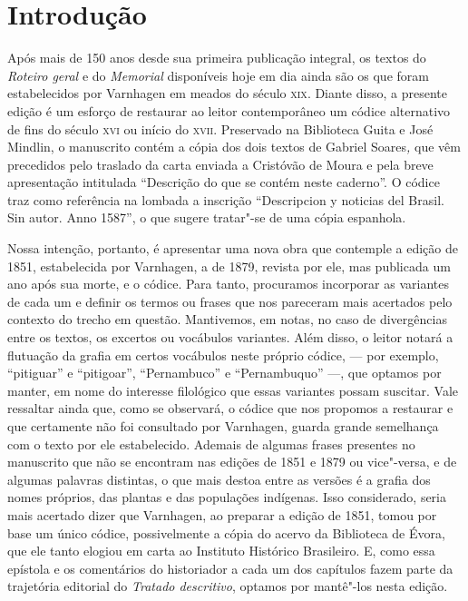 \chapter[Introdução, \emph{por Fernanda Trindade Luciani}]{Introdução}




Após mais de 150 anos desde sua primeira publicação
integral, os textos do \textit{Roteiro geral} e do \textit{Memorial}
disponíveis hoje em dia ainda são os que foram estabelecidos por
Varnhagen em meados do século \textsc{xix}. Diante disso, a presente edição é um
esforço de restaurar ao leitor contemporâneo um códice alternativo de
fins do século \textsc{xvi} ou início do \textsc{xvii}. Preservado na Biblioteca Guita e
José Mindlin, o manuscrito contém a cópia dos dois textos de Gabriel
Soares\textit{,} que vêm precedidos pelo traslado da carta enviada a
Cristóvão de Moura e pela breve apresentação intitulada “Descrição do
que se contém neste caderno”.  O códice traz como referência na lombada
a inscrição “Descripcion y noticias del Brasil. Sin autor. Anno 1587”,
o que sugere tratar"-se de uma cópia espanhola.

Nossa intenção, portanto, é apresentar uma nova obra que contemple a edição
de 1851, estabelecida por Varnhagen, a de 1879, revista por ele, mas publicada um ano após sua
morte, e o códice. Para tanto, procuramos incorporar as
variantes de cada um e definir os termos ou frases que nos pareceram
mais acertados pelo contexto do trecho em questão. Mantivemos, em
notas, no caso de divergências entre os textos, os excertos ou
vocábulos variantes. Além disso, o leitor notará a flutuação da grafia 
em certos vocábulos neste próprio códice, --- por exemplo, ``pitiguar'' e ``pitigoar'', 
``Pernambuco'' e ``Pernambuquo'' ---, que optamos por manter, em nome do interesse 
filológico que essas variantes possam suscitar.
 Vale ressaltar ainda que, como se observará, o
códice que nos propomos a restaurar e que certamente não foi consultado
por Varnhagen, guarda grande semelhança com o texto por ele
estabelecido. Ademais de algumas frases presentes no manuscrito que não
se encontram nas edições de 1851 e 1879 ou vice"-versa, e de algumas
palavras distintas, o que mais destoa entre as versões é a grafia dos
nomes próprios, das plantas e das populações indígenas. Isso
considerado, seria mais acertado dizer que Varnhagen, ao preparar a
edição de 1851, tomou por base um único códice, possivelmente a cópia
do acervo da Biblioteca de Évora, que ele tanto elogiou em carta ao
Instituto Histórico Brasileiro. E, como essa epístola e os comentários
do historiador a cada um dos capítulos fazem parte da trajetória
editorial do \textit{Tratado descritivo}, optamos por mantê"-los nesta edição. 

